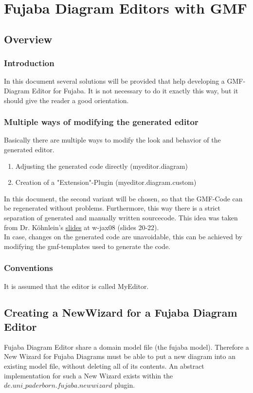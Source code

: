 \chapter{Fujaba Diagram Editors with GMF}
	
\section{Overview}
\subsection{Introduction}
In this document several solutions will be provided that help developing a
GMF-Diagram Editor for Fujaba.
It is not necessary to do it exactly this way, but it should give the reader a
good orientation.

\subsection{Multiple ways of modifying the generated editor}
Basically there are multiple ways to modify the look and behavior of the
generated editor.
\begin{enumerate}
    \item Adjusting the generated code directly (myeditor.diagram)
	\item Creation of a "Extension"-Plugin (myeditor.diagram.custom)
\end{enumerate}

In this document, the second variant will be chosen, so that the GMF-Code can be
regenerated without problems. Furthermore, this way there is a strict separation
of generated and manually written sourcecode. This idea was taken from Dr. Köhnlein's
\href{http://www.slideshare.net/itemis/gmf-fr-anspruchsvolle-presentation}{slides}
at w-jax08 (slides 20-22). \\
In case, changes on the generated code are unavoidable, this can be achieved by
modifying the gmf-templates used to generate the code.

\subsection{Conventions}
It is assumed that the editor is called MyEditor. 

\section {Creating a NewWizard for a Fujaba Diagram Editor}
Fujaba Diagram Editor share a domain model file (the fujaba model).
Therefore a New Wizard for Fujaba Diagrams must be able to put a new
diagram into an existing model file, without deleting all of its contents.
An abstract implementation for such a New Wizard exists within the
$de.uni\_paderborn.fujaba.newwizard$ plugin.

